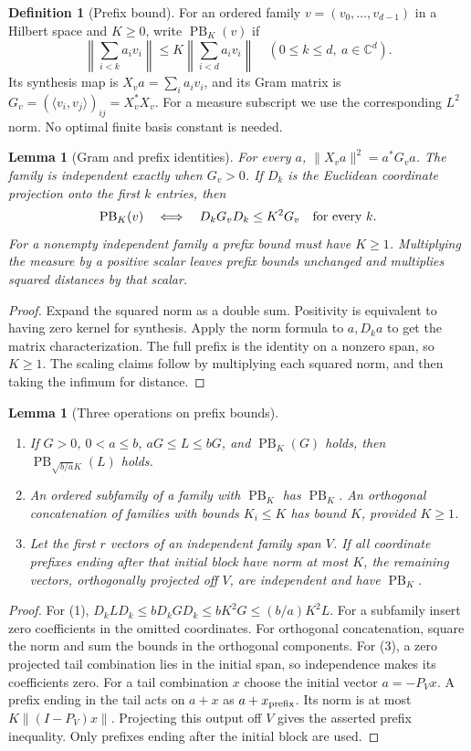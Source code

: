 \documentclass[reqno,a4paper,12pt]{amsart}
\newtheorem{lemma}[theorem]{Lemma}
\theoremstyle{definition}
\newtheorem{definition}[theorem]{Definition}
\newcommand{\C}{\mathbb C}
\newcommand{\ip}[2]{\langle #1,#2\rangle}
\newcommand{\PB}{\operatorname{PB}}
\begin{document}
\begin{definition}[Prefix bound]\label{def:prefix}
For an ordered family $v=(v_0,\ldots,v_{d-1})$ in a Hilbert space and
$K\ge0$, write $\PB_K(v)$ if
\[
 \left\|\sum_{i<k}a_iv_i\right\|
 \le K\left\|\sum_{i<d}a_iv_i\right\|
 \quad(0\le k\le d,\ a\in\C^d).
\]
Its synthesis map is $X_va=\sum_i a_iv_i$, and its Gram matrix is
$G_v=(\ip{v_i}{v_j})_{ij}=X_v^*X_v$.
For a measure subscript we use the corresponding $L^2$ norm.
No optimal finite basis constant is needed.
\end{definition}

\begin{lemma}[Gram and prefix identities]\label{lem:gram-prefix}
For every $a$, $\|X_va\|^2=a^*G_va$. The family is independent exactly
when $G_v>0$. If $D_k$ is the Euclidean coordinate projection onto the
first $k$ entries, then
\[
 \PB_K(v)\quad\Longleftrightarrow\quad D_kG_vD_k\le K^2G_v
 \quad\hbox{for every }k.
\]
For a nonempty independent family a prefix bound must have $K\ge1$.
Multiplying the measure by a positive scalar leaves prefix bounds
unchanged and multiplies squared distances by that scalar.
\end{lemma}
\begin{proof}
Expand the squared norm as a double sum. Positivity is equivalent to
having zero kernel for synthesis. Apply the norm formula to $a,D_ka$
to get the matrix characterization. The full prefix is the identity
on a nonzero span, so $K\ge1$. The scaling claims follow by multiplying
each squared norm, and then taking the infimum for distance.
\end{proof}

\begin{lemma}[Three operations on prefix bounds]\label{lem:prefix-operations}
\begin{enumerate}
\item If $G>0$, $0<a\le b$, $aG\le L\le bG$, and $\PB_K(G)$ holds, then
$\PB_{\sqrt{b/a}K}(L)$ holds.
\item An ordered subfamily of a family with $\PB_K$ has $\PB_K$.
An orthogonal concatenation of families with bounds $K_i\le K$ has
bound $K$, provided $K\ge1$.
\item Let the first $r$ vectors of an independent family span $V$.
If all coordinate prefixes ending after that initial block have norm
at most $K$, the remaining vectors, orthogonally projected off $V$,
are independent and have $\PB_K$.
\end{enumerate}
\end{lemma}
\begin{proof}
For (1), $D_kLD_k\le bD_kGD_k\le bK^2G\le(b/a)K^2L$.
For a subfamily insert zero coefficients in the omitted coordinates.
For orthogonal concatenation, square the norm and sum the bounds in
the orthogonal components.
For (3), a zero projected tail combination lies in the initial span,
so independence makes its coefficients zero. For a tail combination
$x$ choose the initial vector $a=-P_Vx$. A prefix ending in the tail
acts on $a+x$ as $a+x_{\rm prefix}$. Its norm is at most
$K\|(I-P_V)x\|$. Projecting this output off $V$ gives the asserted
prefix inequality. Only prefixes ending after the initial block are used.
\end{proof}
\end{document}
